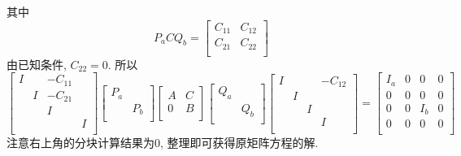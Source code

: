 \begin{itemize}
\begin{solution}
		其中
		\begin{equation*}
		P_a C Q_b = \begin{bmatrix}
			C_{11}&C_{12}\\
			C_{21}&C_{22}\\
		\end{bmatrix}
		\end{equation*}
		由已知条件, $C_{22}=0$. 所以
		\begin{equation*}
		\begin{bmatrix}
			I& &-C_{11}& \\
			&I &-C_{21}&\\
			& &I&\\
			& &&I\\
		\end{bmatrix}
		\begin{bmatrix}
			P_a&\\
			&P_b\\
		\end{bmatrix}
		\begin{bmatrix}
			A&C\\
			0&B\\
		\end{bmatrix}
		\begin{bmatrix}
			Q_a&\\
			&Q_b\\
		\end{bmatrix}
		\begin{bmatrix}
			I& & &-C_{12}\\
			&I & &\\
			& &I&\\
			& &&I\\
		\end{bmatrix}
		=
		\begin{bmatrix}
			I_a&0&0&0\\
			0&0&0&0\\
			0&0& I_b& 0\\
			0&0& 0& 0\\
		\end{bmatrix}
		\end{equation*}
		注意右上角的分块计算结果为0, 整理即可获得原矩阵方程的解.
	\end{solution}
	\vspace{5cm}
\end{itemize}